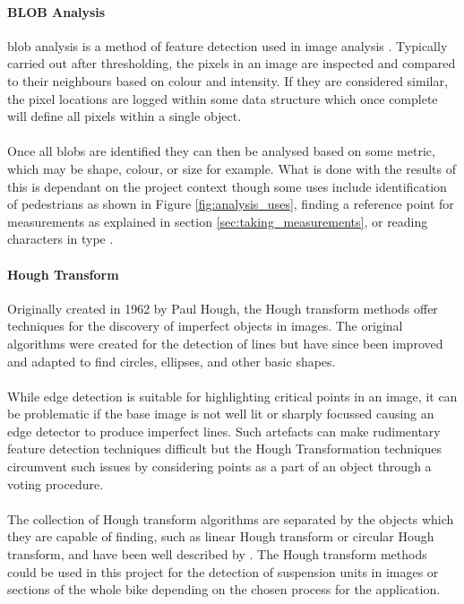 	\paragraph{BLOB Analysis}
		\gls{blob} analysis is a method of feature detection used in image analysis \cite{introtoprocessing}. Typically carried out after thresholding, the pixels in an image are inspected and compared to their neighbours based on colour and intensity. If they are considered similar, the pixel locations are logged within some data structure which once complete will define all pixels within a single object.
		\\\\
		Once all \glspl{blob} are identified they can then be analysed based on some metric, which may be shape, colour, or size for example. What is done with the results of this is dependant on the project context though some uses include identification of pedestrians as shown in Figure \ref{fig:analysis_uses}, finding a reference point for measurements as explained in section \ref{sec:taking_measurements}, or reading characters in type \citep{blob}.		
	\paragraph{Hough Transform}\label{sec:lit_review_hough}
		Originally created in 1962 by Paul Hough, the Hough transform methods offer techniques for the discovery of imperfect objects in images. The original algorithms were created for the detection of lines but have since been improved and adapted to find circles, ellipses, and other basic shapes. 
		\\\\
		While edge detection is suitable for highlighting critical points in an image, it can be problematic if the base image is not well lit or sharply focussed causing an edge detector to produce imperfect lines. Such artefacts can make rudimentary feature detection techniques difficult but the Hough Transformation techniques circumvent such issues by considering points as a part of an object through a voting procedure.
		\\\\
		The collection of Hough transform algorithms are separated by the objects which they are capable of finding, such as linear Hough transform or circular Hough transform, and have been well described by \cite{hough}. The Hough transform methods could be used in this project for the detection of suspension units in images or sections of the whole bike depending on the chosen process for the application.	
